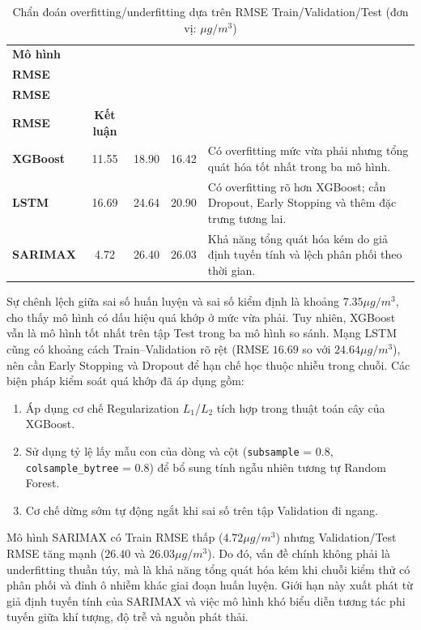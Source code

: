 \documentclass[12pt,a4paper]{article}
\begin{document}
\begin{table}[H]
    \centering
    \caption{Chẩn đoán overfitting/underfitting dựa trên RMSE Train/Validation/Test (đơn vị: $\mu g/m^3$)}
    \label{tab:overfit-diagnosis}
    \begin{tabularx}{\textwidth}{@{}lccc>{\raggedright\arraybackslash}X@{}}
        \toprule
        \textbf{Mô hình} & \shortstack{\textbf{Train}\\\textbf{RMSE}} & \shortstack{\textbf{Validation}\\\textbf{RMSE}} & \shortstack{\textbf{Test}\\\textbf{RMSE}} & \textbf{Kết luận} \\
        \midrule
        \textbf{XGBoost} & 11.55 & 18.90 & 16.42 & Có overfitting mức vừa phải nhưng tổng quát hóa tốt nhất trong ba mô hình. \\
        \textbf{LSTM} & 16.69 & 24.64 & 20.90 & Có overfitting rõ hơn XGBoost; cần Dropout, Early Stopping và thêm đặc trưng tương lai. \\
        \textbf{SARIMAX} & 4.72 & 26.40 & 26.03 & Khả năng tổng quát hóa kém do giả định tuyến tính và lệch phân phối theo thời gian. \\
        \bottomrule
    \end{tabularx}
\end{table}

Sự chênh lệch giữa sai số huấn luyện và sai số kiểm định là khoảng $7.35 \mu g/m^3$, cho thấy mô hình có dấu hiệu quá khớp ở mức vừa phải. Tuy nhiên, XGBoost vẫn là mô hình tốt nhất trên tập Test trong ba mô hình so sánh. Mạng LSTM cũng có khoảng cách Train--Validation rõ rệt (RMSE $16.69$ so với $24.64 \mu g/m^3$), nên cần Early Stopping và Dropout để hạn chế học thuộc nhiễu trong chuỗi. Các biện pháp kiểm soát quá khớp đã áp dụng gồm:
\begin{enumerate}
    \item Áp dụng cơ chế Regularization $L_1$/$L_2$ tích hợp trong thuật toán cây của XGBoost.
    \item Sử dụng tỷ lệ lấy mẫu con của dòng và cột (\texttt{subsample} = 0.8, \texttt{colsample\_bytree} = 0.8) để bổ sung tính ngẫu nhiên tương tự Random Forest.
    \item Cơ chế dừng sớm tự động ngắt khi sai số trên tập Validation đi ngang.
\end{enumerate}

Mô hình SARIMAX có Train RMSE thấp ($4.72 \mu g/m^3$) nhưng Validation/Test RMSE tăng mạnh ($26.40$ và $26.03 \mu g/m^3$). Do đó, vấn đề chính không phải là underfitting thuần túy, mà là khả năng tổng quát hóa kém khi chuỗi kiểm thử có phân phối và đỉnh ô nhiễm khác giai đoạn huấn luyện. Giới hạn này xuất phát từ giả định tuyến tính của SARIMAX và việc mô hình khó biểu diễn tương tác phi tuyến giữa khí tượng, độ trễ và nguồn phát thải.
\end{document}
